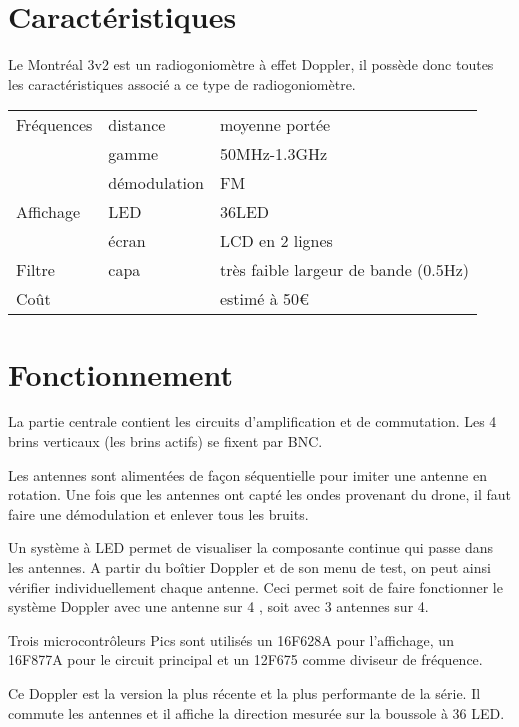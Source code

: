 \section{Caractéristiques}

Le Montréal 3v2 est un radiogoniomètre à effet Doppler, il possède donc toutes les caractéristiques associé a ce type de radiogoniomètre.
~\\

\begin{tabular}{ l l l}
Fréquences & distance & moyenne portée\\
 & gamme & 50MHz-1.3GHz\\
 & démodulation & FM\\
Affichage & LED & 36LED\\
& écran & LCD en 2 lignes\\
Filtre & capa & très faible largeur de bande (0.5Hz)\\
Coût & & estimé à 50\euro \\
\end{tabular}


\section{Fonctionnement}
La partie centrale contient les circuits d'amplification et de commutation. Les 4 brins verticaux (les brins actifs) se fixent par BNC.

Les antennes sont alimentées de façon séquentielle pour imiter une antenne en rotation. Une fois que les antennes ont capté les ondes provenant du drone, il faut faire une démodulation et enlever tous les bruits.


Un système à LED permet de visualiser la composante continue qui passe dans les antennes. A partir du boîtier Doppler et de son menu de test, on peut ainsi vérifier individuellement chaque antenne. Ceci permet soit de faire fonctionner le système Doppler avec une antenne sur 4 %
, soit avec 3 antennes sur 4. %


Trois microcontrôleurs Pics sont utilisés un 16F628A pour l'affichage, un 16F877A pour le circuit principal et un 12F675 comme diviseur de fréquence.

Ce Doppler est la version la plus récente et la plus performante de la série. Il commute les antennes et il affiche la direction mesurée sur la boussole à 36 LED. 


